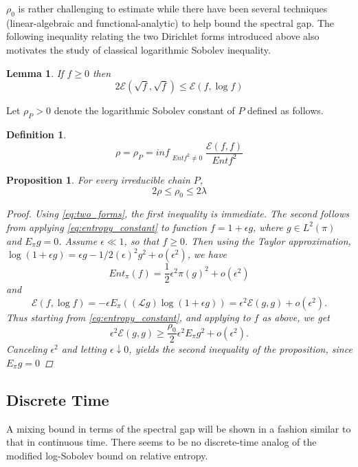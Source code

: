 \documentclass[12pt,reqno]{amsart}
\newtheorem{lem}[thm]{Lemma}
\newtheorem{prop}[thm]{Proposition}
\newtheorem{definition}[thm]{Definition}
{ \theoremstyle{remark}\newtheorem*{remark}{Remark} }
\begin{document}
$\rho_0$ is rather challenging to estimate while there have been several techniques (linear-algebraic and functional-analytic) to help bound the spectral gap. The following inequality relating the two Dirichlet forms introduced above also motivates the study of classical logarithmic Sobolev inequality. 
\begin{lem}
  If $f\geq 0$ then
  \begin{equation}
    \label{eq:two_forms}
    2\mathcal{E}(\sqrt{f}, \sqrt{f}) \leq \mathcal{E}(f,\log f)
  \end{equation}
\end{lem}

Let $\rho_P > 0$ denote the logarithmic Sobolev constant of $P$ defined as follows.
\begin{definition}

  $$\displaystyle \rho = \rho_P = {inf}_{\substack{Ent f^2\neq 0}}\frac{\mathcal{E}(f,f)}{Ent f^2}$$

\end{definition}

\begin{prop}
  For every irreducible chain $P$,
$$2\rho \leq \rho_0 \leq 2\lambda$$
  \begin{proof}
    Using \eqref{eq:two_forms}, the first inequality is immediate. The second follows from applying \eqref{eq:entropy_constant} to function $f = 1 + \epsilon g$, where $g\in L^2(\pi)$ and $E_{\pi}g=0$. Assume $\epsilon \ll 1$, so that $f \geq 0$. Then using the Taylor approximation, 
$\log(1+\epsilon g) = \epsilon g - 1/2 (\epsilon)^2g^2+o(\epsilon^2)$, we have 
$$Ent_{\pi}(f) = \frac{1}{2}\epsilon^2\pi(g)^2 + o(\epsilon^2)
$$
and
$$ \mathcal{E}(f,\log f) = -\epsilon E_{\pi}((\mathcal{L}g)\log(1+\epsilon g)) = 
\epsilon^2\mathcal{E}(g,g)+o(\epsilon^2).
$$
Thus starting from \eqref{eq:entropy_constant}, and applying to $f$ as above, we get
$$
\epsilon^2 \mathcal{E}(g,g) \geq \frac{\rho_0}{2}\epsilon^2E_{\pi}g^2+o(\epsilon^2).
$$
Canceling $\epsilon^2$ and letting $\epsilon \downarrow 0$, yields the second inequality of the proposition, since $E_{\pi}g=0$
  \end{proof}
\end{prop}


\subsection{Discrete Time}
A mixing bound in terms of the spectral gap will be shown in a fashion similar to that in
continuous time. There seems to be no discrete-time analog of the modified log-Sobolev bound on relative entropy.
\end{document}
